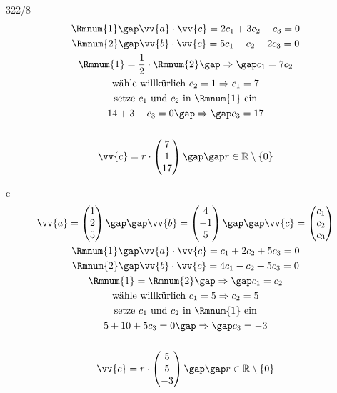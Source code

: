 \begin{exercise}{322/8}
\begin{gather*}
    \text{\Rmnum{1}} \gap \vv{a} \cdot \vv{c} = 2c_1 + 3c_2 - c_3 = 0 \\
    \text{\Rmnum{2}} \gap \vv{b} \cdot \vv{c} = 5c_1 - c_2 - 2c_3 = 0 \\
    \text{\Rmnum{1}} = \frac{1}{2} \cdot \text{\Rmnum{2}} \gap\Rightarrow\gap c_1 = 7c_2 \\
    \text{wähle willkürlich } c_2 = 1 \Rightarrow c_1 = 7 \\
    \text{setze $c_1$ und $c_2$ in \Rmnum{1} ein} \\
    14 + 3 - c_3 = 0 \gap\Rightarrow\gap c_3 = 17 \\\\
    \vv{c} = r \cdot \begin{pmatrix}7 \\ 1 \\ 17\end{pmatrix} \gap\gap r \in \mathbb{R} \setminus \{0\}
  \end{gather*}
  \item [c]
  \begin{gather*}
    \vv{a} = \begin{pmatrix}1 \\ 2 \\ 5\end{pmatrix} \gap\gap \vv{b} = \begin{pmatrix}4 \\ -1 \\ 5\end{pmatrix} \gap\gap \vv{c} = \begin{pmatrix}c_1 \\ c_2 \\ c_3\end{pmatrix} \\
    \text{\Rmnum{1}} \gap \vv{a} \cdot \vv{c} = c_1 + 2c_2 + 5c_3 = 0 \\
    \text{\Rmnum{2}} \gap \vv{b} \cdot \vv{c} = 4c_1 - c_2 + 5c_3 = 0 \\
    \text{\Rmnum{1}} = \text{\Rmnum{2}} \gap\Rightarrow\gap c_1 = c_2 \\
    \text{wähle willkürlich } c_1 = 5 \Rightarrow c_2 = 5 \\
    \text{setze $c_1$ und $c_2$ in \Rmnum{1} ein} \\
    5 + 10 + 5c_3 = 0 \gap\Rightarrow\gap c_3 = -3 \\\\
  \vv{c} = r \cdot \begin{pmatrix}5 \\ 5 \\ -3\end{pmatrix} \gap\gap r \in \mathbb{R} \setminus \{0\}
  \end{gather*}
\end{exercise}
